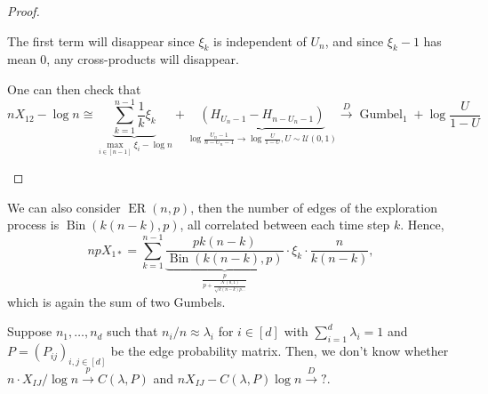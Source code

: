 \begin{proof}
	\begin{note}
		The first term will disappear since \(\xi _k\) is independent of \(U_n\), and since \(\xi _k - 1\) has mean \(0\), any cross-products will disappear.
	\end{note}

	One can then check that
	\[
		n X_{12} - \log n
		\cong \underbrace{\sum_{k=1}^{n-1} \frac{1}{k} \xi _k}_{ \max _{i \in [n-1]} \xi _i - \log n} + \underbrace{(H_{U_n - 1} - H_{n - U_n - 1})}_{\log \frac{U_n - 1}{n - U_n - 1} \to \log \frac{U}{1 - U}, U \sim \mathcal{U} (0, 1)}
		\overset{D}{\to} \operatorname{Gumbel}_1 + \log \frac{U}{1 - U}
	\]

	\begin{intuition}

	\end{intuition}
\end{proof}

\begin{remark}
	We can also consider \(\operatorname{ER}(n, p) \), then the number of edges of the exploration process is \(\operatorname{Bin}(k (n-k), p) \), all correlated between each time step \(k\). Hence,
	\[
		np X_{1 \ast}
		= \sum_{k=1}^{n-1} \underbrace{\frac{p k (n-k)}{\operatorname{Bin}(k (n - k) , p) }}_{\frac{p}{p + \frac{\mathcal{N} (0, 1)}{\sqrt{k (n - k) p \dots } }}} \cdot \xi _k \cdot \frac{n}{k (n-k)},
	\]
	which is again the sum of two Gumbels.
\end{remark}

\begin{problem*}
	Suppose \(n_1, \dots , n_d\) such that \(n_i / n \approx \lambda _i\) for \(i \in [d]\) with \(\sum_{i=1}^{d} \lambda _i = 1\) and \(P = (P_{ij})_{i, j \in [d]}\) be the edge probability matrix. Then, we don't know whether \(n \cdot X_{IJ} / \log n \overset{p}{\to} C(\lambda , P)\) and \(n X_{IJ} - C(\lambda , P) \log n \overset{D}{\to} ?\).
\end{problem*}

